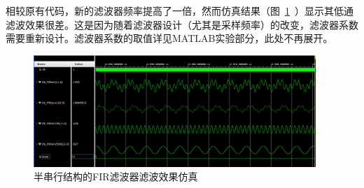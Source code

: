 相较原有代码，新的滤波器频率提高了一倍，然而仿真结果（图~\ref{fig:half_serial}~）显示其低通滤波效果很差。这是因为随着滤波器设计（尤其是采样频率）的改变，滤波器系数需要重新设计。滤波器系数的取值详见MATLAB实验部分，此处不再展开。
\begin{figure}[htbp]
    \includegraphics[width=0.95\textwidth]{figure/exp6/waveform_2adders.png}
    \caption{半串行结构的FIR滤波器滤波效果仿真}
    \label{fig:half_serial}
\end{figure}

